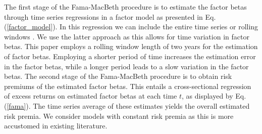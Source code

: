 \par The first stage of the Fama-MacBeth procedure is to estimate the factor betas through time series regressions in a factor model as presented in Eq.(\ref{factor_model}). In this regression we can include the entire time series \citep{jensen1972capital} or rolling windows \citep{fama1973risk}. We use the latter approach as this allows for time variation in factor betas. This paper employs a rolling window length of two years for the estimation of factor betas. Employing a shorter period of time increases the estimation error in the factor betas, while a longer period leads to a slow variation in the factor betas. The second stage of the Fama-MacBeth procedure is to obtain risk premiums of the estimated factor betas. This entails a cross-sectional regression of excess returns on estimated factor betas at each time $t$, as displayed by Eq.(\ref{fama}). The time series average of these estimates yields the overall estimated risk premia. We consider models with constant risk premia as this is more accustomed in existing literature. 


